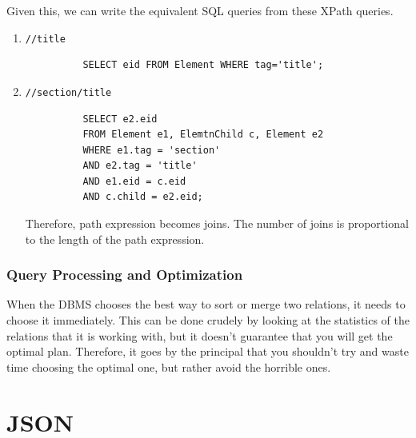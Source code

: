 \documentclass{article}
\begin{document}
    Given this, we can write the equivalent SQL queries from these XPath queries. 
    \begin{enumerate}
      \item \texttt{//title} 
        \begin{lstlisting}
          SELECT eid FROM Element WHERE tag='title';
        \end{lstlisting}

      \item \texttt{//section/title} 
        \begin{lstlisting}
          SELECT e2.eid 
          FROM Element e1, ElemtnChild c, Element e2 
          WHERE e1.tag = 'section' 
          AND e2.tag = 'title' 
          AND e1.eid = c.eid 
          AND c.child = e2.eid;
        \end{lstlisting}
        Therefore, path expression becomes joins. The number of joins is proportional to the length of the path expression. 
    \end{enumerate}

  \subsubsection{Query Processing and Optimization} 
    
    When the DBMS chooses the best way to sort or merge two relations, it needs to choose it immediately. This can be done crudely by looking at the statistics of the relations that it is working with, but it doesn't guarantee that you will get the optimal plan. Therefore, it goes by the principal that you shouldn't try and waste time choosing the optimal one, but rather avoid the horrible ones. 


\section{JSON}
\end{document}
